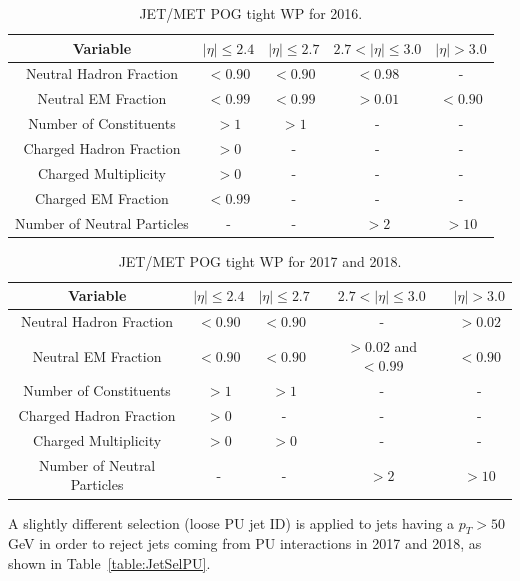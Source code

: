 \documentclass[a4paper, 10pt, openright]{report}
\begin{document}
\begin{table}
\begin{center}
\begin{tabular}{ c|c|c|c|c } 
 \hline
 Variable & $|\eta| \leq 2.4$ & $|\eta| \leq 2.7$ & $2.7 < |\eta| \leq 3.0$ & $|\eta| > 3.0$ \\
\hline
Neutral Hadron Fraction & $< 0.90$ & $< 0.90$ & $< 0.98$ & - \\
Neutral EM Fraction & $< 0.99$ & $< 0.99$ & $> 0.01$ & $< 0.90$ \\ 
Number of Constituents & $> 1$ & $> 1$ & - & - \\
Charged Hadron Fraction & $> 0$ & - & - & - \\
Charged Multiplicity & $> 0$ & - & - & - \\
Charged EM Fraction & $< 0.99$ & - & - & - \\
Number of Neutral Particles	 & - & - & $> 2$ & $> 10$ \\
\hline
\end{tabular}
\caption{JET/MET \ac{POG} tight \ac{WP} for 2016.}
\label{table:JetID2016}
\end{center}
\end{table}

\begin{table}
\begin{center}
\begin{tabular}{ c|c|c|c|c } 
 \hline
 Variable & $|\eta| \leq 2.4$ & $|\eta| \leq 2.7$ & $2.7 < |\eta| \leq 3.0$ & $|\eta| > 3.0$ \\
\hline
Neutral Hadron Fraction & $< 0.90$ & $< 0.90$ & - & $> 0.02$ \\
Neutral EM Fraction & $< 0.90$ & $< 0.90$ & $> 0.02$ and $<0.99$ & $< 0.90$ \\
Number of Constituents & $> 1$ & $> 1$ & - & - \\
Charged Hadron Fraction & $> 0$ & - & - & - \\
Charged Multiplicity & $> 0$ & $> 0$ & - & - \\
Number of Neutral Particles & - & - & $> 2$ & $> 10$ \\
\hline
\end{tabular}
\caption{JET/MET \ac{POG} tight \ac{WP} for 2017 and 2018.}
\label{table:JetID2017}
\end{center}
\end{table}

A slightly different selection (loose \ac{PU} jet ID) is applied to jets having a $p_T > 50$ GeV in order to reject jets coming from \ac{PU} interactions in 2017 and 2018, as shown in Table~\ref{table:JetSelPU}.
\end{document}
